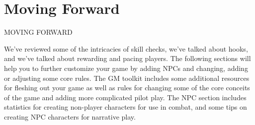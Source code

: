 \section{Moving Forward}
                                       MOVING FORWARD

We’ve reviewed some of the intricacies of skill checks, we’ve talked about hooks, and we’ve
talked about rewarding and pacing players. The following sections will help you to further
customize your game by adding NPCs and changing, adding or adjusting some core rules.
The GM toolkit includes some additional resources for fleshing out your game as well as rules
for changing some of the core conceits of the game and adding more complicated pilot play. The
NPC section includes statistics for creating non-player characters for use in combat, and some
tips on creating NPC characters for narrative play.

